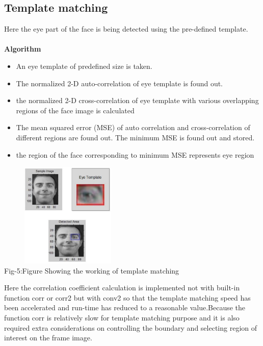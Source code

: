 \documentclass[final,3p,times,twocolumn,sort&compress]{elsarticle}
\begin{document}
\subsection{Template matching}
Here the eye part of the face is being detected using the pre-defined template.\\ $ $\\
\textbf{Algorithm}
\begin{itemize}
\item An eye template of predefined size is taken.
\item The normalized 2-D auto-correlation of eye template is found out.
\item the normalized 2-D cross-correlation of eye template with
various overlapping regions of the face image is calculated
\item The mean squared error  (MSE) of auto correlation and
cross-correlation of different regions are found out. The minimum
MSE is found out and stored.
\item the region of the face corresponding to minimum MSE
represents eye region
\end{itemize}
 \begin{center}
 \includegraphics[width=6.6cm,height=5cm]{TempMatching}\\
  Fig-5:Figure Showing the working of template matching\\
 \end{center}

Here the correlation coefficient calculation is implemented not with built-in function corr or corr2 but with conv2 so that the template matching speed has been accelerated and run-time has reduced to a reasonable value.Because the
function corr is relatively slow for template matching purpose and it is also required extra considerations on controlling the boundary and selecting region of interest on the frame image.
\end{document}
